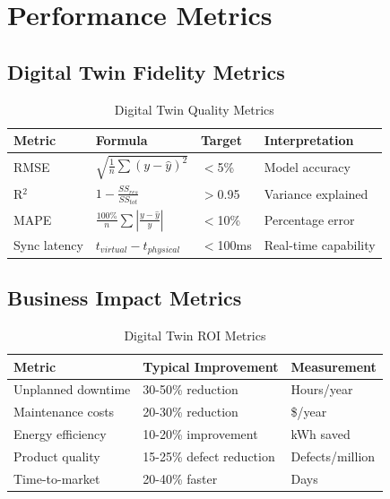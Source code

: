 \documentclass[12pt,a4paper]{article}
\begin{document}
\section{Performance Metrics}

\subsection{Digital Twin Fidelity Metrics}

\begin{table}[H]
\centering
\caption{Digital Twin Quality Metrics}
\begin{tabular}{llll}
\toprule
\textbf{Metric} & \textbf{Formula} & \textbf{Target} & \textbf{Interpretation} \\
\midrule
RMSE & $\sqrt{\frac{1}{n}\sum(y-\hat{y})^2}$ & $<$5\% & Model accuracy \\
R$^2$ & $1 - \frac{SS_{res}}{SS_{tot}}$ & $>$0.95 & Variance explained \\
MAPE & $\frac{100\%}{n}\sum|\frac{y-\hat{y}}{y}|$ & $<$10\% & Percentage error \\
Sync latency & $t_{virtual} - t_{physical}$ & $<$100ms & Real-time capability \\
\bottomrule
\end{tabular}
\end{table}

\subsection{Business Impact Metrics}

\begin{table}[H]
\centering
\caption{Digital Twin ROI Metrics}
\begin{tabular}{lll}
\toprule
\textbf{Metric} & \textbf{Typical Improvement} & \textbf{Measurement} \\
\midrule
Unplanned downtime & 30-50\% reduction & Hours/year \\
Maintenance costs & 20-30\% reduction & \$/year \\
Energy efficiency & 10-20\% improvement & kWh saved \\
Product quality & 15-25\% defect reduction & Defects/million \\
Time-to-market & 20-40\% faster & Days \\
\bottomrule
\end{tabular}
\end{table}
\end{document}
